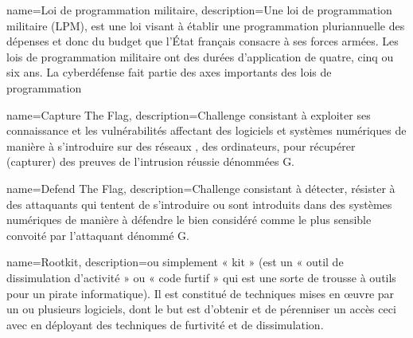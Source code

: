 %
%


{
name={Loi de programmation militaire},
description={Une loi de programmation militaire (LPM), est une loi visant à établir une programmation pluriannuelle des dépenses et donc du budget que l'État français consacre à ses forces armées. Les lois de programmation militaire ont des durées d'application de quatre, cinq ou six ans. La cyberdéfense fait partie des axes importants des lois de programmation}
}

{
name={Capture The Flag},
description={Challenge consistant à exploiter ses connaissance et les vulnérabilités affectant des logiciels  et systèmes numériques de manière à s’introduire sur des réseaux , des ordinateurs, pour récupérer (capturer) des preuves de l’intrusion réussie dénommées G.}
}

{
name={Defend The Flag},
description={Challenge consistant à détecter, résister à des attaquants qui tentent de s'introduire ou sont introduits dans des systèmes numériques de manière à défendre le bien considéré comme le plus sensible convoité par l'attaquant dénommé G.}
}


{
name={Rootkit},
description={ou simplement « kit » (est un « outil de dissimulation d'activité » ou  « code furtif » qui est une sorte de trousse à outils pour un pirate informatique). Il est constitué  de techniques mises en œuvre par un ou plusieurs logiciels, dont le but est d'obtenir et de pérenniser un accès ceci avec en déployant des techniques de furtivité et de dissimulation.}
}
